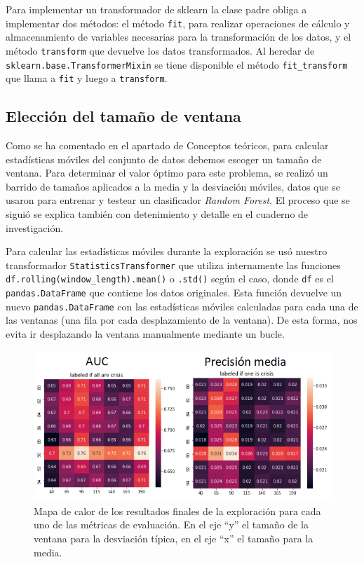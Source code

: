 Para implementar un transformador de sklearn la clase padre obliga a implementar dos métodos: el método \texttt{fit}, para realizar operaciones de cálculo y almacenamiento de variables necesarias para la transformación de los datos, y el método \texttt{transform} que devuelve los datos transformados. Al heredar de \texttt{sklearn.base.TransformerMixin} se tiene disponible el método \texttt{fit\_transform} que llama a \texttt{fit} y luego a \texttt{transform}. 

\subsection{Elección del tamaño de ventana}

Como se ha comentado en el apartado de Conceptos teóricos, para calcular estadísticas móviles del conjunto de datos debemos escoger un tamaño de ventana. Para determinar el valor óptimo para este problema, se realizó un barrido de tamaños aplicados a la media y la desviación móviles, datos que se usaron para entrenar y testear un clasificador \textit{Random Forest}. El proceso que se siguió se explica también con detenimiento y detalle en el cuaderno de investigación. 

Para calcular las estadísticas móviles durante la exploración se usó nuestro transformador \texttt{StatisticsTransformer} que utiliza internamente las funciones  \texttt{df.rolling(window\_length).mean()} o \texttt{.std()} según el caso, donde \texttt{df} es el \texttt{pandas.DataFrame} que contiene los datos originales. Esta función devuelve un nuevo \texttt{pandas.DataFrame} con las estadísticas móviles calculadas para cada una de las ventanas (una fila por cada desplazamiento de la ventana). De esta forma, nos evita ir desplazando la ventana manualmente mediante un bucle. 

\begin{figure}[H]
	\centering
	\includegraphics[width=1\textwidth]{../img/heatmap.png}
	\caption{Mapa de calor de los resultados finales de la exploración para cada uno de las métricas de evaluación. En el eje ``y'' el tamaño de la ventana para la desviación típica, en el eje ``x'' el tamaño para la media.}
	\label{fig:heatmap}
\end{figure}


